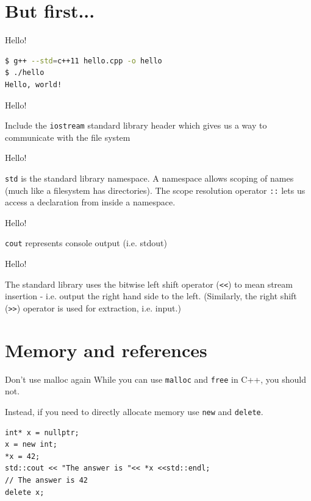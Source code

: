 \documentclass[presentation,t]{beamer}
\newcommand{\code}[1]{\lstinline!#1!}
\begin{document}
\newcommand{\helloworld}[1]{
  \hfill
}
\section{But first...}

\begin{frame}[fragile]{Hello!}
  \helloworld{}
  \pause
\begin{lstlisting}[language=bash]
$ g++ --std=c++11 hello.cpp -o hello
$ ./hello 
Hello, world!
\end{lstlisting}
\end{frame}

\begin{frame}[fragile]{Hello!}
  \helloworld{iostream}

  Include the \code{iostream} standard library header which gives us a
  way to communicate with the file system
\end{frame}

\begin{frame}[fragile]{Hello!}
  \helloworld{std}
  
  \code{std} is the standard library namespace. A namespace allows
  scoping of names (much like a filesystem has directories).
  \vfill
  The scope resolution operator \code{::} lets us access a declaration
  from inside a namespace.
\end{frame}

\begin{frame}[fragile]{Hello!}
  \helloworld{cout}

  \code{cout} represents console output (i.e. stdout)
\end{frame}

\begin{frame}[fragile]{Hello!}
  \helloworld{<<}
  
  The standard library uses the bitwise left shift operator
  (\code{<<}) to mean stream insertion - i.e. output the right hand
  side to the left.
  \vfill{}
  (Similarly, the right shift (\code{>>}) operator is used for
  extraction, i.e. input.)
\end{frame}

\section{Memory and references}

\begin{frame}[fragile]{Don't use malloc again}
  While you can use \code{malloc} and \code{free} in C++, you should
  not.

  Instead, if you need to directly allocate memory use \code{new} and
  \code{delete}.
  
\begin{lstlisting}
int* x = nullptr;
x = new int;
*x = 42;
std::cout << "The answer is "<< *x <<std::endl;
// The answer is 42
delete x;
\end{lstlisting}

\end{frame}
\end{document}
